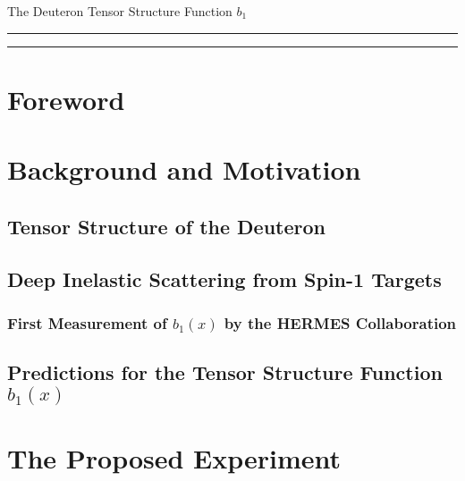 \documentclass[12pt]{article}
\begin{document}
\pagestyle{empty}
 
\begin{center}
 \LARGE{
  The Deuteron Tensor Structure Function $b_1$
 }
\end{center}
%
\hrule \vspace{.05cm}\hrule
%


\newpage

\begin{abstract}
  
\end{abstract}

\newpage

\section*{Foreword}




\clearpage


\tableofcontents


\pagestyle{plain}

\clearpage

\section{Background and Motivation}

\subsection{Tensor Structure of the Deuteron}
 
\subsection{Deep Inelastic Scattering from Spin-1 Targets}
 

\subsubsection{First Measurement of $b_1(x)$ by the HERMES Collaboration}
 

\subsection{Predictions for the Tensor Structure Function $b_1(x)$}
\label{PREDB1X}
   


\section{The Proposed Experiment}


%
%

\end{document}
